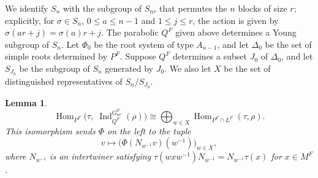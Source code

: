 \documentclass[12pt]{article}
\newtheorem{lemma}[theorem]{Lemma}
\theoremstyle{remark}
\begin{document}
We identify $S_n$ with the subgroup of $S_{nr}$ that permutes the $n$ blocks of size $r$; explicitly, for $\sigma \in S_n$, $0 \le a \le n-1$ and $1 \le j \le r$, the action is given by $\sigma(ar + j) = \sigma(a) r + j$. The parabolic $Q^F$ given above determines a Young subgroup of $S_n$. Let $\Phi_0$ be the root system of type $A_{n-1}$, and let $\Delta_0$ be the set of simple roots determined by $P^F$. Suppose $Q^F$ determines a subset $J_0$ of $\Delta_0$, and let $S_{J_0}$ be the subgroup of $S_n$ generated by $J_0$. We also let $X$ be the set of distinguished representatives of $S_n/S_{J_0}$.

\begin{lemma}
\label{lem:Hom-decomp}
$$
\operatorname{Hom}_{P^F}\bigl(\tau,\; \operatorname{Ind}_{Q^F}^{G_{nr}^F}(\rho)\bigr) \cong \bigoplus_{w \in X} \operatorname{Hom}_{P^F \cap L^F}(\tau, \rho).
$$
This isomorphism sends $\Phi$ on the left to the tuple
$$
v \longmapsto \bigl( \Phi(N_{w^{-1}} v)(w^{-1}) \bigr)_{w \in X},
$$
where $N_{w^{-1}}$ is an intertwiner satisfying $\tau(w x w^{-1}) N_{w^{-1}} = N_{w^{-1}} \tau(x)$ for $x \in M^F$.
\end{lemma}
\end{document}
